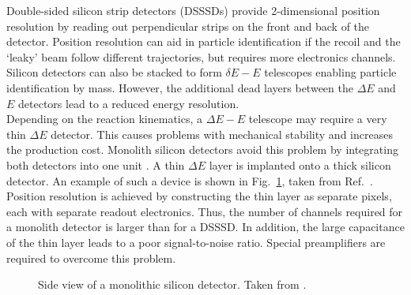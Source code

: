 %
Double-sided silicon strip detectors (DSSSDs) provide 2-dimensional position resolution by reading out perpendicular strips on the front and back of the detector. Position resolution can aid in particle identification if the recoil and the `leaky' beam follow different trajectories, but requires more electronics channels. Silicon detectors can also be stacked to form $\delta{}E-E$ telescopes enabling particle identification by mass. However, the additional dead layers between the $\Delta{}E$ and $E$ detectors lead to a reduced energy resolution.\\  
Depending on the reaction kinematics, a $\Delta{}E-E$ telescope may require a very thin $\Delta{}E$ detector. This causes problems with mechanical stability and increases the production cost. Monolith silicon detectors avoid this problem by integrating both detectors into one unit \cite{card96}. A thin $\Delta{}E$ layer is implanted onto a thick silicon detector. An example of such a device is shown in Fig.\ \ref{fig:monolith}, taken from Ref.\ \cite{tudi99}. Position resolution is achieved by constructing the thin layer as separate pixels, each with separate readout electronics. Thus, the number of channels required for a monolith detector is larger than for a DSSSD. In addition, the large capacitance of the thin layer leads to a poor signal-to-noise ratio. Special preamplifiers are required to overcome this problem.%
%
\begin{figure}
\centering
{}
\caption{Side view of a monolithic silicon detector. Taken from \cite{tudi99}.}
\label{fig:monolith}
\end{figure}
%

